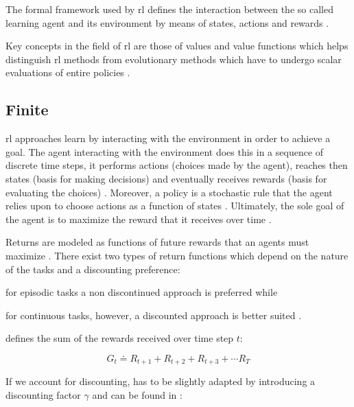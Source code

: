 \documentclass{seal_thesis}
\begin{document}
The formal framework used by \gls{rl} defines the interaction between the so called learning agent and its environment by means of states, actions and rewards \cite[p. 15]{Sutton2017}.

Key concepts in the field of \gls{rl} are those of values and value functions which helps distinguish \gls{rl} methods from evolutionary methods which have to undergo scalar evaluations of entire policies \cite[p. 15]{Sutton2017}.

\subsection{Finite }

\gls{rl} approaches learn by interacting with the environment in order to achieve a goal. The agent interacting with the environment does this in a sequence of discrete time steps, it performs actions (choices made by the agent), reaches then states (basis for making decisions) and eventually receives rewards (basis for evaluating the choices) \cite[p. 73]{Sutton2017}. Moreover, a policy is a stochastic rule that the agent relies upon to choose actions as a function of states \cite[p. 73]{Sutton2017}. Ultimately, the sole goal of the agent is to maximize the reward that it receives over time \cite[p. 73]{Sutton2017}.

Returns are modeled as functions of future rewards that an agents must maximize \cite[p. 73]{Sutton2017}. There exist two types of return functions which depend on the nature of the tasks and a discounting preference:
\begin{enumerate*}
	\item for episodic tasks a non discontinued approach is preferred while
	\item for continuous tasks, however, a discounted approach is better suited \cite[p. 73]{Sutton2017}.
\end{enumerate*}

 defines the sum of the rewards received over time step $t$:

\begin{equation}
\label{eq:expected_return}
	G_t  \doteq R_{t+1} + R_{t+2} + R_{t+3} + \cdots R_{T}
\end{equation}

If we account for discounting,  has to be slightly adapted by introducing a discounting factor $\gamma$ and can be found in :
\end{document}
